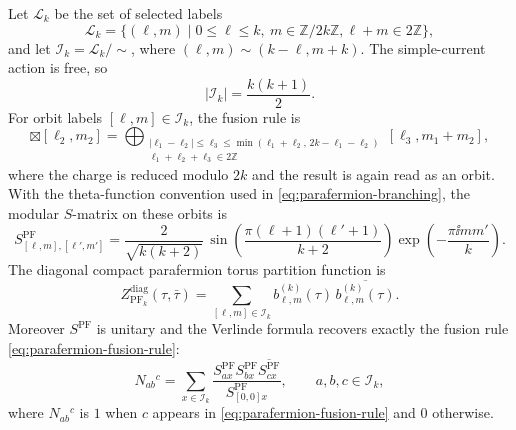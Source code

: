 \begin{proposition}
\label{prop:parafermion-fusion-modular-data}
Let \(\mathcal L_k\) be the set of selected labels
\[
  \mathcal L_k
  =
  \{(\ell,m)\mid 0\le \ell\le k,\ m\in\mathbb Z/2k\mathbb Z,
  \ell+m\in2\mathbb Z\},
\]
and let \(\mathcal I_k=\mathcal L_k/\!\sim\), where
\((\ell,m)\sim(k-\ell,m+k)\).  The simple-current action is free, so
\[
  |\mathcal I_k|=\frac{k(k+1)}2 .
\]
For orbit labels \([\ell,m]\in\mathcal I_k\), the fusion rule is
\begin{equation}
  [\ell_1,m_1]\boxtimes[\ell_2,m_2]
  =
  \bigoplus_{\substack{
      |\ell_1-\ell_2|\le \ell_3\le
      \min(\ell_1+\ell_2,\,2k-\ell_1-\ell_2)\\
      \ell_1+\ell_2+\ell_3\in2\mathbb Z}}
  [\ell_3,m_1+m_2],
  \label{eq:parafermion-fusion-rule}
\end{equation}
where the charge is reduced modulo \(2k\) and the result is again read as
an orbit.  With the theta-function convention used in
\eqref{eq:parafermion-branching}, the modular \(S\)-matrix on these orbits
is
\begin{equation}
  S^{\operatorname{PF}}_{[\ell,m],[\ell',m']}
  =
  \frac{2}{\sqrt{k(k+2)}}\,
  \sin\!\left(\frac{\pi(\ell+1)(\ell'+1)}{k+2}\right)
  \exp\!\left(-\frac{\pi\ii mm'}{k}\right).
  \label{eq:parafermion-modular-s}
\end{equation}
The diagonal compact parafermion torus partition function is
\begin{equation}
  Z_{\operatorname{PF}_k}^{\operatorname{diag}}(\tau,\bar\tau)
  =
  \sum_{[\ell,m]\in\mathcal I_k}
  b^{(k)}_{\ell,m}(\tau)\,
  \overline{b^{(k)}_{\ell,m}(\tau)} .
  \label{eq:parafermion-diagonal-partition-function}
\end{equation}
Moreover \(S^{\operatorname{PF}}\) is unitary and the Verlinde formula
recovers exactly the fusion rule \eqref{eq:parafermion-fusion-rule}:
\begin{equation}
  N_{ab}{}^{c}
  =
  \sum_{x\in\mathcal I_k}
  \frac{
    S^{\operatorname{PF}}_{a x}
    S^{\operatorname{PF}}_{b x}
    \overline{S^{\operatorname{PF}}_{c x}}
  }{
    S^{\operatorname{PF}}_{[0,0] x}
  },
  \qquad
  a,b,c\in\mathcal I_k,
  \label{eq:parafermion-verlinde}
\end{equation}
where \(N_{ab}{}^c\) is \(1\) when \(c\) appears in
\eqref{eq:parafermion-fusion-rule} and \(0\) otherwise.
\end{proposition}

